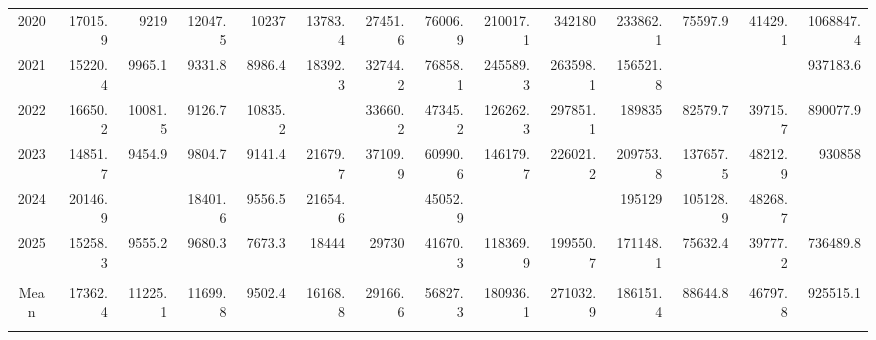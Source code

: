 \begin{longtable}[t]{crrrrrrrrrrrrr}
2020 & 17015.9 & 9219 & 12047.5 & 10237 & 13783.4 & 27451.6 & 76006.9 & 210017.1 & 342180 & 233862.1 & 75597.9 & 41429.1 & 1068847.4\\
2021 & 15220.4 & 9965.1 & 9331.8 & 8986.4 & 18392.3 & 32744.2 & 76858.1 & 245589.3 & 263598.1 & 156521.8 & \cellcolor{green}{62506} & \cellcolor{green}{37470} & 937183.6\\
2022 & 16650.2 & 10081.5 & 9126.7 & 10835.2 & \cellcolor{red}{26135} & 33660.2 & 47345.2 & 126262.3 & 297851.1 & 189835 & 82579.7 & 39715.7 & 890077.9\\
2023 & 14851.7 & 9454.9 & 9804.7 & 9141.4 & 21679.7 & 37109.9 & 60990.6 & 146179.7 & 226021.2 & 209753.8 & 137657.5 & 48212.9 & 930858\\
2024 & 20146.9 & \cellcolor{red}{21595.3} & 18401.6 & 9556.5 & 21654.6 & \cellcolor{red}{46379.2} & 45052.9 & \cellcolor{red}{355946.4} & \cellcolor{red}{412944.7} & 195129 & 105128.9 & 48268.7 & \cellcolor{red}{1300204.8}\\
2025 & 15258.3 & 9555.2 & 9680.3 & 7673.3 & 18444 & 29730 & 41670.3 & 118369.9 & 199550.7 & 171148.1 & 75632.4 & 39777.2 & 736489.8\\
\midrule
\cellcolor{red}{Max} & \cellcolor{red}{33237.3} & \cellcolor{red}{21595.3} & \cellcolor{red}{21571.7} & \cellcolor{red}{14072.1} & \cellcolor{red}{26135} & \cellcolor{red}{46379.2} & \cellcolor{red}{83317.3} & \cellcolor{red}{355946.4} & \cellcolor{red}{412944.7} & \cellcolor{red}{274222.5} & \cellcolor{red}{140893.2} & \cellcolor{red}{96867.6} & \cellcolor{red}{1300204.8}\\
Mean & 17362.4 & 11225.1 & 11699.8 & 9502.4 & 16168.8 & 29166.6 & 56827.3 & 180936.1 & 271032.9 & 186151.4 & 88644.8 & 46797.8 & 925515.1\\
\cellcolor{green}{Min} & \cellcolor{green}{12360.9} & \cellcolor{green}{8860.3} & \cellcolor{green}{8638} & \cellcolor{green}{7345.6} & \cellcolor{green}{9884.6} & \cellcolor{green}{23059.9} & \cellcolor{green}{37120.8} & \cellcolor{green}{112306.1} & \cellcolor{green}{196334.7} & \cellcolor{green}{122251.1} & \cellcolor{green}{62506} & \cellcolor{green}{37470} & \cellcolor{green}{656177.8}\\*
\end{longtable}
